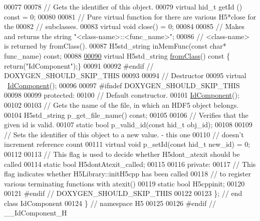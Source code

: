 \begin{DoxyCode}
00077 
00078         \textcolor{comment}{// Gets the identifier of this object.}
00079         \textcolor{keyword}{virtual} hid\_t getId () \textcolor{keyword}{const} = 0;
00080 
00081         \textcolor{comment}{// Pure virtual function for there are various H5*close for the}
00082         \textcolor{comment}{// subclasses.}
00083         \textcolor{keyword}{virtual} \textcolor{keywordtype}{void} close() = 0;
00084 
00085         \textcolor{comment}{// Makes and returns the string "<class-name>::<func\_name>";}
00086         \textcolor{comment}{// <class-name> is returned by fromClass().}
00087         H5std\_string inMemFunc(\textcolor{keyword}{const} \textcolor{keywordtype}{char}* func\_name) \textcolor{keyword}{const};
00088 
\hyperlink{class_h5_1_1_id_component_a5b2f8dc9fbc2890d10c5db9ae80ddb74}{00090}         \textcolor{keyword}{virtual} H5std\_string \hyperlink{class_h5_1_1_id_component_a5b2f8dc9fbc2890d10c5db9ae80ddb74}{fromClass}()\textcolor{keyword}{ const }\{ \textcolor{keywordflow}{return}(\textcolor{stringliteral}{"IdComponent"});\}
00091 
00092 \textcolor{preprocessor}{#endif // DOXYGEN\_SHOULD\_SKIP\_THIS}
00093 
00094         \textcolor{comment}{// Destructor}
00095         \textcolor{keyword}{virtual} ~\hyperlink{class_h5_1_1_id_component}{IdComponent}();
00096 
00097 \textcolor{preprocessor}{#ifndef DOXYGEN\_SHOULD\_SKIP\_THIS}
00098 
00099     \textcolor{keyword}{protected}:
00100         \textcolor{comment}{// Default constructor.}
00101         \hyperlink{class_h5_1_1_id_component}{IdComponent}();
00102 
00103         \textcolor{comment}{// Gets the name of the file, in which an HDF5 object belongs.}
00104         H5std\_string p\_get\_file\_name() \textcolor{keyword}{const};
00105 
00106         \textcolor{comment}{// Verifies that the given id is valid.}
00107         \textcolor{keyword}{static} \textcolor{keywordtype}{bool} p\_valid\_id(\textcolor{keyword}{const} hid\_t obj\_id);
00108 
00109         \textcolor{comment}{// Sets the identifier of this object to a new value. - this one}
00110         \textcolor{comment}{// doesn't increment reference count}
00111         \textcolor{keyword}{virtual} \textcolor{keywordtype}{void} p\_setId(\textcolor{keyword}{const} hid\_t new\_id) = 0;
00112 
00113         \textcolor{comment}{// This flag is used to decide whether H5dont\_atexit should be called}
00114         \textcolor{keyword}{static} \textcolor{keywordtype}{bool} H5dontAtexit\_called;
00115 
00116     \textcolor{keyword}{private}:
00117         \textcolor{comment}{// This flag indicates whether H5Library::initH5cpp has been called}
00118         \textcolor{comment}{// to register various terminating functions with atexit()}
00119         \textcolor{keyword}{static} \textcolor{keywordtype}{bool} H5cppinit;
00120 
00121 \textcolor{preprocessor}{#endif // DOXYGEN\_SHOULD\_SKIP\_THIS}
00122 
00123 \}; \textcolor{comment}{// end class IdComponent}
00124 \} \textcolor{comment}{// namespace H5}
00125 
00126 \textcolor{preprocessor}{#endif // \_\_IdComponent\_H}
\end{DoxyCode}
